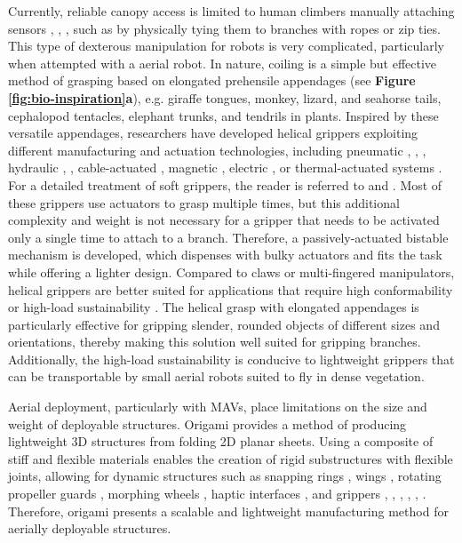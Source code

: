 Currently, reliable canopy access is limited to human climbers manually attaching sensors \cite{Anderson2020a}, \cite{Didham2014}, \cite{Cannon2021}, such as by physically tying them to branches with ropes or zip ties. This type of dexterous manipulation for robots is very complicated, particularly when attempted with a aerial robot. In nature, coiling is a simple but effective method of grasping based on elongated prehensile appendages (see \textbf{Figure \ref{fig:bio-inspiration}a}), e.g. giraffe tongues, monkey, lizard, and seahorse tails, cephalopod tentacles, elephant trunks, and tendrils in plants. Inspired by these versatile appendages, researchers have developed helical grippers exploiting different manufacturing and actuation technologies, including pneumatic \mbox{\cite{Kumar2018}}, \mbox{\cite{Hu2020}}, \mbox{\cite{Pal2020ElasticMachines}}, hydraulic \mbox{\cite{Galloway2016}}, \mbox{\cite{Hoang2020a}}, cable-actuated \mbox{\cite{Mazzolai2019}}, magnetic \mbox{\cite{Wu2021StretchableTwisting}}, electric \mbox{\cite{Meder2022AArrangement}}, \mbox{\cite{Shao2018BioinspiredActuators}} or thermal-actuated systems \mbox{\cite{Wang2018}}. For a detailed treatment of soft grippers, the reader is referred to \mbox{\cite{Shintake2018SoftGrippers}} and \mbox{\cite{Chi2022}}. Most of these grippers use actuators to grasp multiple times, but this additional complexity and weight is not necessary for a gripper that needs to be activated only a single time to attach to a branch. Therefore, a passively-actuated bistable mechanism is developed, which dispenses with bulky actuators and fits the task while offering a lighter design. Compared to claws or multi-fingered manipulators, helical grippers are better suited for applications that require high conformability or high-load sustainability \cite{Hoang2020a}. The helical grasp with elongated appendages is particularly effective for gripping slender, rounded objects of different sizes and orientations, thereby making this solution well suited for gripping branches. Additionally, the high-load sustainability is conducive to lightweight grippers that can be transportable by small aerial robots suited to fly in dense vegetation.

Aerial deployment, particularly with MAVs, place limitations on the size and weight of deployable structures. Origami provides a method of producing lightweight 3D structures from folding 2D planar sheets. Using a composite of stiff and flexible materials enables the creation of rigid substructures with flexible joints, allowing for dynamic structures such as snapping rings \cite{Wu2021}, wings \cite{Baek2020}, rotating propeller guards \cite{Sareh2018}, morphing wheels \cite{Lee2021}, haptic interfaces \cite{Mintchev2019}, and grippers \cite{Li2019d}, \cite{Mintchev2018}, \cite{Faber2018a}, \cite{Firouzeh2017a}, \cite{Boyvat2017}, \cite{Kim2018c}. Therefore, origami presents a scalable and lightweight manufacturing method for aerially deployable structures.

